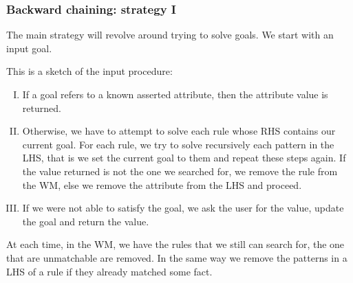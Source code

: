\documentclass[xcolor={usenames,dvipsnames,svgnames}, compress]{beamer}
\begin{document}

\begin{frame}
  \frametitle{Backward chaining: strategy I}
  The main strategy will revolve around trying to solve goals. We
  start with an input goal.\par\bigskip
  This is a sketch of the input procedure:

  \begin{enumerate}[I.]
  \item If a goal refers to a known asserted attribute, then the attribute
    value is returned.
  \item Otherwise, we have to \textsf{attempt} to solve each rule whose RHS contains
    our current goal. For each rule, we try to solve recursively each
    pattern in the LHS, that is we set the current goal to them and
    repeat these steps again. If the value returned is not the one we
    searched for, we remove the rule from the WM, else we remove the
    attribute from the LHS and proceed.
  \item If we were not able to satisfy the goal, we ask the user for
    the value, update the goal and return the value.
  \end{enumerate}\bigskip

  At each time, in the WM, we have the rules that we still can search
  for, the one that are unmatchable are removed. In the same way we
  remove the patterns in a LHS of a rule if they already matched some fact.
  
\end{frame}
\end{document}
